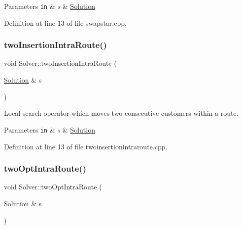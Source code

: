 \begin{DoxyParams}[1]{Parameters}
\mbox{\tt in}  & {\em s} & \hyperlink{class_solution}{Solution} \\
\hline
\end{DoxyParams}


Definition at line 13 of file swapstar.\+cpp.

\mbox{\label{class_solver_a12e5223233047d7f4b1a9db554f5cea3}} 
\subsubsection{\texorpdfstring{two\+Insertion\+Intra\+Route()}{twoInsertionIntraRoute()}}
{\footnotesize\ttfamily void Solver\+::two\+Insertion\+Intra\+Route (\begin{DoxyParamCaption}\item[{\hyperlink{class_solution}{Solution} \&}]{s }\end{DoxyParamCaption})\hspace{0.3cm}{\ttfamily [private]}}

Local search operator which moves two consecutive customers within a route.


\begin{DoxyParams}[1]{Parameters}
\mbox{\tt in}  & {\em s} & \hyperlink{class_solution}{Solution} \\
\hline
\end{DoxyParams}


Definition at line 13 of file twoinsertionintraroute.\+cpp.

\mbox{\label{class_solver_aa3cd5b7d58611e9bf621cb861e371780}} 
\subsubsection{\texorpdfstring{two\+Opt\+Intra\+Route()}{twoOptIntraRoute()}}
{\footnotesize\ttfamily void Solver\+::two\+Opt\+Intra\+Route (\begin{DoxyParamCaption}\item[{\hyperlink{class_solution}{Solution} \&}]{s }\end{DoxyParamCaption})\hspace{0.3cm}{\ttfamily [private]}}



